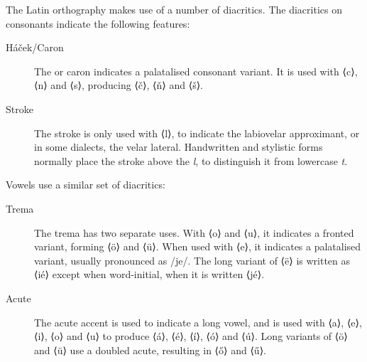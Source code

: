 \documentclass[grammar]{subfiles}
\begin{document}
  \pagebreak[2]
  The Latin orthography makes use of a number of diacritics. The diacritics on consonants indicate the following features:

  \begin{description}
    \item[Háček/Caron] The  or caron indicates a palatalised consonant variant. It is used with ⟨c⟩, ⟨n⟩ and ⟨s⟩, producing ⟨č⟩, ⟨ň⟩ and ⟨š⟩.
    \item[Stroke] The stroke is only used with ⟨l⟩, to indicate the labiovelar approximant, or in some dialects, the velar lateral. Handwritten and stylistic forms normally place the stroke above the \textit l, to distinguish it from lowercase \textit t.
  \end{description}

  \pagebreak[2]
  Vowels use a similar set of diacritics:

  \begin{description}
    \item[Trema] The trema has two separate uses. With ⟨o⟩ and ⟨u⟩, it indicates a fronted variant, forming ⟨ö⟩ and ⟨ü⟩. When used with ⟨e⟩, it indicates a palatalised variant, usually pronounced as /je/. The long variant of ⟨ë⟩ is written as ⟨ié⟩ except when word-initial, when it is written ⟨jé⟩. 


    \item[Acute] The acute accent is used to indicate a long vowel, and is used with ⟨a⟩, ⟨e⟩, ⟨i⟩, ⟨o⟩ and ⟨u⟩ to produce ⟨á⟩, ⟨é⟩, ⟨í⟩, ⟨ó⟩ and ⟨ú⟩. Long variants of ⟨ö⟩ and ⟨ü⟩ use a doubled acute, resulting in ⟨ő⟩ and ⟨ű⟩. 
  \end{description}
\end{document}
